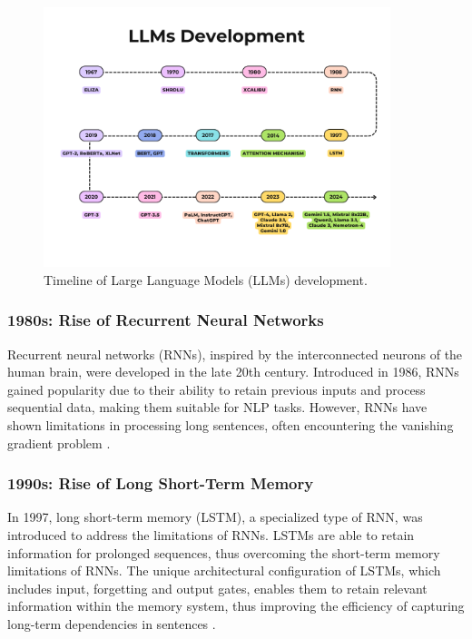 \begin{figure}[h!]
    \centering
    \includegraphics[width=0.9\textwidth]{images/llms/llms-timeline.png}
    \caption{Timeline of Large Language Models (LLMs) development.}
    \label{fig:llms-history}
\end{figure}

\subsubsection{1980s: Rise of Recurrent Neural Networks}

Recurrent neural networks (RNNs), inspired by the interconnected neurons of the human brain, were developed in the late 20th century. Introduced in 1986, RNNs gained popularity due to their ability to retain previous inputs and process sequential data, making them suitable for NLP tasks. However, RNNs have shown limitations in processing long sentences, often encountering the vanishing gradient problem \cite{elman1990finding}.

\subsubsection{1990s: Rise of Long Short-Term Memory}

In 1997, long short-term memory (LSTM), a specialized type of RNN, was introduced to address the limitations of RNNs. LSTMs are able to retain information for prolonged sequences, thus overcoming the short-term memory limitations of RNNs. The unique architectural configuration of LSTMs, which includes input, forgetting and output gates, enables them to retain relevant information within the memory system, thus improving the efficiency of capturing long-term dependencies in sentences \cite{hochreiter1997long}.

